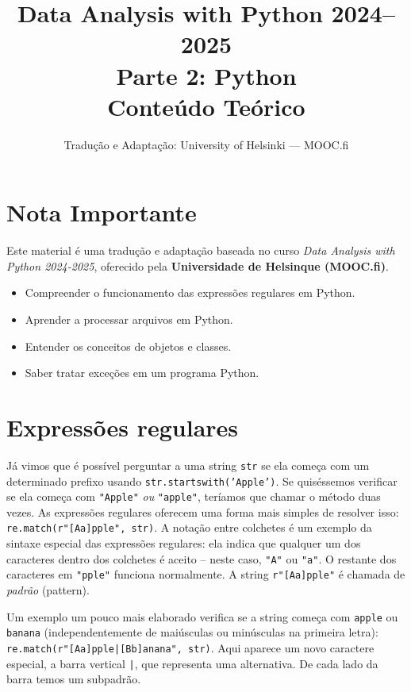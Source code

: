 \documentclass[11pt,a4paper]{article}
\title{\textbf{Data Analysis with Python 2024--2025}\\Parte 2: Python\\\large Conteúdo Teórico}
\author{Tradução e Adaptação: University of Helsinki --- MOOC.fi}
\date{}
\begin{document}
\maketitle

\section*{Nota Importante}
Este material é uma tradução e adaptação baseada no curso \textit{Data Analysis with Python 2024-2025}, oferecido pela \textbf{Universidade de Helsinque (MOOC.fi)}.

\begin{objetivos}
\begin{itemize}
\item Compreender o funcionamento das expressões regulares em Python.
\item Aprender a processar arquivos em Python.
\item Entender os conceitos de objetos e classes.
\item Saber tratar exceções em um programa Python.
\end{itemize}
\end{objetivos}

\tableofcontents
\newpage

\section{Expressões regulares}

Já vimos que é possível perguntar a uma string \texttt{str} se ela começa
com um determinado prefixo usando \texttt{str.startswith('Apple')}. Se
quiséssemos verificar se ela começa com \texttt{"Apple"} \emph{ou}
\texttt{"apple"}, teríamos que chamar o método duas vezes. As expressões
regulares oferecem uma forma mais simples de resolver isso:
\texttt{re.match(r"[Aa]pple", str)}. A notação entre colchetes é um
exemplo da sintaxe especial das expressões regulares: ela indica que
qualquer um dos caracteres dentro dos colchetes é aceito -- neste caso,
\texttt{"A"} ou \texttt{"a"}. O restante dos caracteres em \texttt{"pple"}
funciona normalmente. A string \texttt{r"[Aa]pple"} é chamada de
\emph{padrão} (pattern).

Um exemplo um pouco mais elaborado verifica se a string começa com
\texttt{apple} ou \texttt{banana} (independentemente de maiúsculas ou
minúsculas na primeira letra):
\texttt{re.match(r"[Aa]pple|[Bb]anana", str)}. Aqui aparece um novo
caractere especial, a barra vertical \texttt{|}, que representa uma
alternativa. De cada lado da barra temos um subpadrão.
\end{document}
